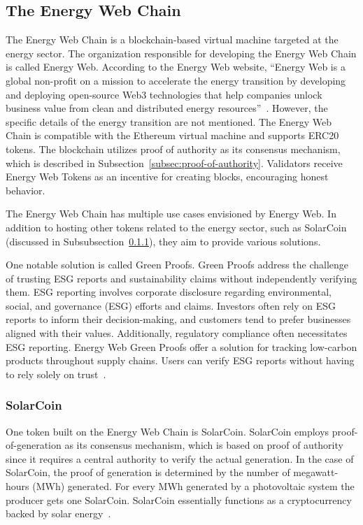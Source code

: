 \subsection{The Energy Web Chain}\label{subsec:the-energy-web-chain}
The Energy Web Chain is a blockchain-based virtual machine targeted at the energy sector.
The organization responsible for developing the Energy Web Chain is called Energy Web.
According to the Energy Web website, ``Energy Web is a global non-profit on a mission to accelerate the energy transition by developing and deploying open-source Web3 technologies that help companies unlock business value from clean and distributed energy resources''~\cite{kraken-ewc}.
However, the specific details of the energy transition are not mentioned.
The Energy Web Chain is compatible with the Ethereum virtual machine and supports ERC20 tokens.
The blockchain utilizes proof of authority as its consensus mechanism, which is described in Subsection~\ref{subsec:proof-of-authority}.
Validators receive Energy Web Tokens as an incentive for creating blocks, encouraging honest behavior.

The Energy Web Chain has multiple use cases envisioned by Energy Web.
In addition to hosting other tokens related to the energy sector, such as SolarCoin (discussed in Subsubsection~\ref{subsubsec:solarcoin}), they aim to provide various solutions.

One notable solution is called Green Proofs.
Green Proofs address the challenge of trusting ESG reports and sustainability claims without independently verifying them.
ESG reporting involves corporate disclosure regarding environmental, social, and governance (ESG) efforts and claims.
Investors often rely on ESG reports to inform their decision-making, and customers tend to prefer businesses aligned with their values.
Additionally, regulatory compliance often necessitates ESG reporting.
Energy Web Green Proofs offer a solution for tracking low-carbon products throughout supply chains.
Users can verify ESG reports without having to rely solely on trust~\cite{ESG-reporting, EW-green-proofs}.

\subsubsection{SolarCoin}\label{subsubsec:solarcoin}
One token built on the Energy Web Chain is SolarCoin.
SolarCoin employs proof-of-generation as its consensus mechanism, which is based on proof of authority since it requires a central authority to verify the actual generation.
In the case of SolarCoin, the proof of generation is determined by the number of megawatt-hours (MWh) generated.
For every MWh generated by a photovoltaic system the producer gets one SolarCoin.
SolarCoin essentially functions as a cryptocurrency backed by solar energy~\cite{solarcoin-save-the-planet}.